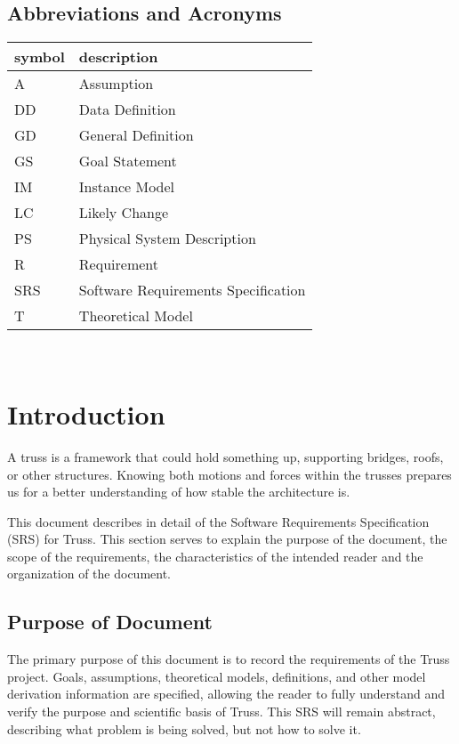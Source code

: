\documentclass[12pt]{article}
\begin{document}
\subsection{Abbreviations and Acronyms}

\renewcommand{\arraystretch}{1.2}
\begin{tabular}{l l} 
  \toprule		
  \textbf{symbol} & \textbf{description}\\
  \midrule 
  A & Assumption\\
  DD & Data Definition\\
  GD & General Definition\\
  GS & Goal Statement\\
  IM & Instance Model\\
  LC & Likely Change\\
  PS & Physical System Description\\
  R & Requirement\\
  SRS & Software Requirements Specification\\
  T & Theoretical Model\\
  \bottomrule
\end{tabular}\\


\newpage


\section{Introduction}
A truss is a framework that could hold something up, supporting bridges, roofs, 
or other structures. Knowing both motions and forces within the trusses 
prepares us for a better understanding of how stable the architecture 
is. 

This document describes in detail of the Software Requirements Specification 
(SRS) for Truss. This section serves to explain the purpose of the document, 
the scope of the requirements, the characteristics of the intended reader and 
the organization of the document.

\subsection{Purpose of Document}

The primary purpose of this document is to record the requirements of the Truss 
project. Goals, assumptions, theoretical models, definitions, and other model 
derivation information are specified, allowing the reader to fully understand 
and verify the purpose and scientific basis of Truss. This SRS will remain 
abstract, describing what problem is being solved, but not how to solve 
it.
\end{document}
